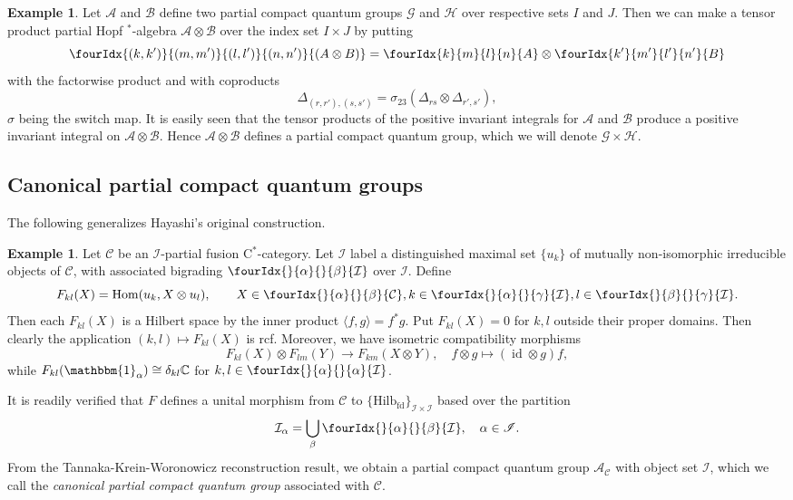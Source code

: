 \documentclass[10pt]{article}
\DeclareMathOperator{\fin}{\mathrm{fd}}
\DeclareMathOperator{\id}{id}
\DeclareMathOperator{\Hom}{Hom}
\newcommand{\C}{\mathbb{C}}
\newcommand{\CatC}{\mathcal{C}}
\newcommand{\CatCC}{\mathscr{C}}
\newcommand{\Hilb}{\mathrm{Hilb}}
\newcommand{\Unitb}{\mathbbm{1}}
\newcommand{\Gr}[5]{\fourIdx{#2}{#4}{#3}{#5}{#1}}%
\newcommand{\Gru}[3]{\Gr{#1}{}{}{#2}{#3}}
\theoremstyle{definition}
\newtheorem{Exa}[Theorem]{Example}
\numberwithin{equation}{section}
\begin{document}
\begin{Exa} Let $\mathscr{A}$ and $\mathscr{B}$ define two partial compact quantum groups $\mathscr{G}$ and $\mathscr{H}$ over respective sets $I$ and $J$. Then we can make a tensor product partial Hopf $^*$-algebra $\mathscr{A}\otimes \mathscr{B}$ over the index set $I\times J$ by putting \[\Gr{(A\otimes B)}{(k,k')}{(l,l')}{(m,m')}{(n,n')} = \Gr{A}{k}{l}{m}{n}\otimes \Gr{B}{k'}{l'}{m'}{n'}\] with the factorwise product and with coproducts \[\Delta_{(r,r'),(s,s')} = \sigma_{23}(\Delta_{rs}\otimes \Delta_{r',s'}),\] $\sigma$ being the switch map. It is easily seen that the tensor products of the positive invariant integrals for $\mathscr{A}$ and $\mathscr{B}$ produce a positive invariant integral on $\mathscr{A}\otimes \mathscr{B}$. Hence $\mathscr{A}\otimes \mathscr{B}$ defines a partial compact quantum group, which we will denote $\mathscr{G}\times \mathscr{H}$.
\end{Exa}

\subsection{Canonical partial compact quantum groups} \label{SubSecCan}

The following generalizes Hayashi's original construction.

\begin{Exa} 
Let $\CatCC$ be an $\mathscr{I}$-partial fusion C$^*$-category. Let $\mathcal{I}$ label a distinguished maximal set $\{u_k\}$ of mutually non-isomorphic irreducible objects of $\CatC$, with associated bigrading $\Gru{\mathcal{I}}{\alpha}{\beta}$ over $\mathscr{I}$. Define \[F_{kl}(X)  = \Hom(u_k,  X\otimes u_l),\qquad X\in \Gru{\CatC}{\alpha}{\beta}, k\in \Gru{\mathcal{I}}{\alpha}{\gamma},l\in \Gru{\mathcal{I}}{\beta}{\gamma}.\] Then each $F_{kl}(X)$ is a Hilbert space by the inner product $\langle f,g\rangle = f^*g$. Put $F_{kl}(X) = 0$ for $k,l$ outside their proper domains. Then clearly the application $(k,l)\mapsto F_{kl}(X)$ is rcf. Moreover, we have isometric compatibility morphisms \[F_{kl}(X)\otimes F_{lm}(Y)\rightarrow F_{km}(X\otimes Y),\quad f\otimes g \mapsto (\id\otimes g)f,\] while $F_{kl}(\Unitb_{\alpha}) \cong \delta_{kl} \C$ for $k,l\in \Gru{\mathcal{I}}{\alpha}{\alpha}$. 

It is readily verified that $F$ defines a unital morphism from $\CatCC$ to $\{\Hilb_{\fin}\}_{\mathcal{I}\times \mathcal{I}}$ based over the partition \[\mathcal{I}_{\alpha} = \bigcup_{\beta} \Gru{\mathcal{I}}{\alpha}{\beta},\quad\alpha\in \mathscr{I}.\] From the Tannaka-Krein-Woronowicz reconstruction result, we obtain a partial compact quantum group $\mathscr{A}_{\CatCC}$ with object set $\mathcal{I}$, which we call the \emph{canonical partial compact quantum group} associated with $\CatCC$. 
\end{Exa} 
\end{document}
